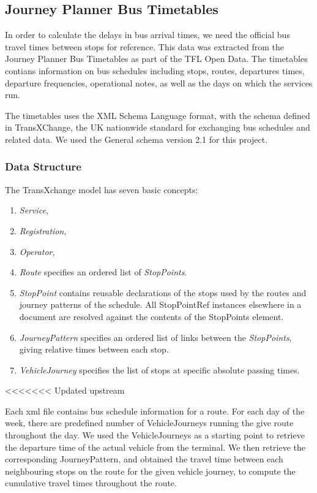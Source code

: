 \subsection{Journey Planner Bus Timetables}
In order to calculate the delays in bus arrival times, we need the official bus travel times between stops for reference. This data was extracted from the Journey Planner Bus Timetables\cite{open_data_feeds_description} as part of the TFL Open Data. The timetables contians information on bus schedules including stops, routes, departures times, departure frequencies, operational notes, as well as the days on which the services run.

The timetables uses the XML Schema Language\cite{xml} format, with the schema defined in TransXChange\cite{transxchange}, the UK nationwide standard for exchanging bus schedules and related data. We used the General schema version 2.1\cite{transxchange_downloads_and_schema}\cite{transxchange_schema_2.1_xsd} for this project.

\subsubsection{Data Structure}
The TransXchange model has seven basic concepts\cite{transxchange_schema_guide}:
\begin{enumerate}
  \item \textit{Service},
  \item \textit{Registration},
  \item \textit{Operator},
  \item \textit{Route} specifies an ordered list of \textit{StopPoints}.
  \item \textit{StopPoint} contains reusable declarations of the stops used by the routes and journey patterns of the schedule. All StopPointRef instances elsewhere in a document are resolved against the contents of the StopPoints element.
  \item \textit{JourneyPattern} specifies an ordered list of links between the \textit{StopPoints}, giving
relative times between each stop.
  \item \textit{VehicleJourney} specifies the list of stops at specific absolute passing times.
\end{enumerate}
<<<<<<< Updated upstream
\par Each xml file contains bus schedule information for a route. For each day of the week, there are predefined number of VehicleJourneys running the give route throughout the day. We used the VehicleJourneys as a starting point to retrieve the departure time of the actual vehicle from the terminal. We then retrieve the corresponding JourneyPattern, and obtained the travel time between each neighbouring stops on the route for the given vehicle journey, to compute the cumulative travel times throughout the route.

